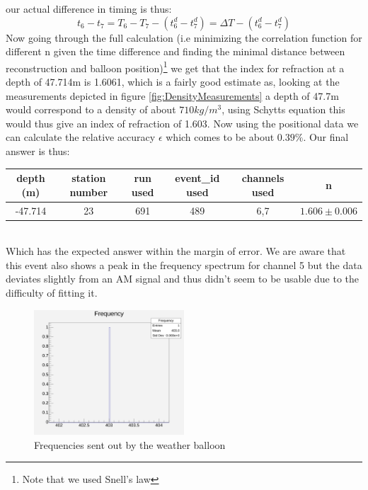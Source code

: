 \documentclass[11pt,a4paper,faculty=we,language=en,doctype=report]{cls/ugent-doc}
\begin{document}
our actual difference
in timing is thus:
\begin{equation}
	t_6 - t_7 = T_6 - T_7 - (t_6^d - t_7^d) = \Delta T - (t_6^d - t_7^d)
\end{equation}
Now going through the full calculation (i.e minimizing the correlation function
for different n given the time difference and finding the minimal distance
between reconstruction and balloon position)\footnote{Note that we used Snell's
law} we get that the index for refraction at a depth of 47.714m is 1.6061,
which is a fairly good estimate as, looking at the measurements depicted in
figure \ref{fig:DensityMeasurements} a depth of 47.7m would correspond to a
density of about $710 kg/m^3$, using Schytts equation this would thus give an
index of refraction of 1.603.  Now using the positional data we can calculate
the relative accuracy $\epsilon$ which comes to be about $0.39\%$. Our final
answer is thus:
\begin{table}[h]
    \centering
    \begin{tabular}{c|c|c|c|c|c}
      depth (m)& station number & run used & event\_id used & channels used & n\\
      \hline
      -47.714 & 23 & 691 & 489 & 6,7 & $1.606 \pm 0.006$
    \end{tabular}
\end{table}\\
Which has the expected answer within the margin of error. We are aware that this event 
also shows a peak in the frequency spectrum for channel 5 but the data deviates slightly
from an AM signal and thus didn't seem to be usable due to the difficulty of fitting it. 
\begin{figure}
  \centering
  \includegraphics[width=0.5\textwidth]{Frequencies.pdf}
  \caption{Frequencies sent out by the weather balloon}
  \label{fig:BalloonFreq}
\end{figure}
\newpage
\end{document}
